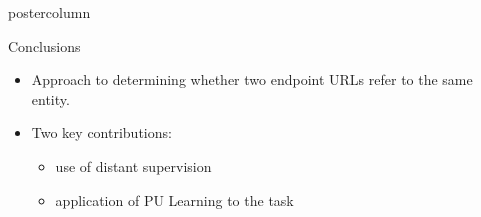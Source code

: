 \documentclass{beamer}
\begin{document}
\begin{frame}
\begin{columns}
\begin{column}{.5\textwidth}
\begin{beamercolorbox}[center]{postercolumn}
\begin{minipage}{.98\textwidth}
{            \begin{block}{Conclusions}
              \begin{itemize}
              \item Approach to determining whether two endpoint URLs refer to the same entity.
              \item Two key contributions:
                \begin{itemize}
                \item  use of distant supervision
                \item  application of PU Learning to the task
                \end{itemize}
              \end{itemize}
	\vspace{0.5em}
            \end{block}
		}\end{minipage}\end{beamercolorbox}
	\end{column}
\end{columns}
\end{frame}
\end{document}

